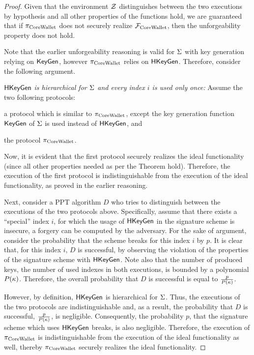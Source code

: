 \begin{proof}
    Given that the environment $\mathcal{Z}$ distinguishes between the two executions
    by hypothesis and all other properties of the functions hold, we are
    guaranteed that if $\pi_\mathrm{CoreWallet}$ does not securely realize $\mathcal{F}_\mathrm{CoreWallet}$, then the
    unforgeability property does not hold.

    Note that the earlier unforgeability reasoning is valid for $\Sigma$
    with key generation relying on $\mathsf{KeyGen}$, however $\pi_\mathrm{CoreWallet}$ relies on
    $\mathsf{HKeyGen}$. Therefore, consider the following argument.

    \emph{$\mathsf{HKeyGen}$ is hierarchical for $\Sigma$ and
    every index $i$ is used only once:} Assume the two following protocols:
        \begin{inparaenum}[i)]
            \item a protocol which is similar to $\pi_\mathrm{CoreWallet}$, except the key
                generation function $\mathsf{KeyGen}$ of $\Sigma$ is used
                instead of $\mathsf{HKeyGen}$, and
            \item the protocol $\pi_\mathrm{CoreWallet}$.
        \end{inparaenum}
        Now, it is evident that the first protocol securely realizes the ideal
        functionality (since all other properties needed as per the Theorem
        hold). Therefore, the execution of the first protocol is
        indistinguishable from the execution of the ideal functionality, as
        proved in the earlier reasoning.

        Next, consider a PPT algorithm $D$ who tries to distinguish between the
        executions of the two protocols above. Specifically, assume that there
        exists a ``special'' index $i$, for which the usage of
        $\mathsf{HKeyGen}$ in the signature scheme is insecure, \ie a
        forgery can be computed by the adversary. For the sake of argument,
        consider the probability that the scheme breaks for this index $i$ by
        $p$. It is clear that, for this index $i$, $D$ is successful, by
        observing the violation of the properties of the signature scheme with
        $\mathsf{HKeyGen}$. Note also that the number of produced keys,
        \ie the number of used indexes in both executions, is bounded by a
        polynomial $P(\kappa)$. Therefore, the overall probability that $D$
        is successful is equal to $\frac{p}{P(\kappa)}$.

        However, by definition, $\mathsf{HKeyGen}$ is hierarchical for
        $\Sigma$. Thus, the executions of the two protocols are
        indistinguishable and, as a result, the probability that $D$ is
        successful, \ie $\frac{p}{P(\kappa)}$, is negligible. Consequently,
        the probability $p$, \ie that the signature scheme which uses
        $\mathsf{HKeyGen}$ breaks, is also negligible. Therefore, the
        execution of $\pi_\mathrm{CoreWallet}$ is indistinguishable from the execution of the
        ideal functionality as well, thereby $\pi_\mathrm{CoreWallet}$ securely realizes the
        ideal functionality.


\end{proof}
